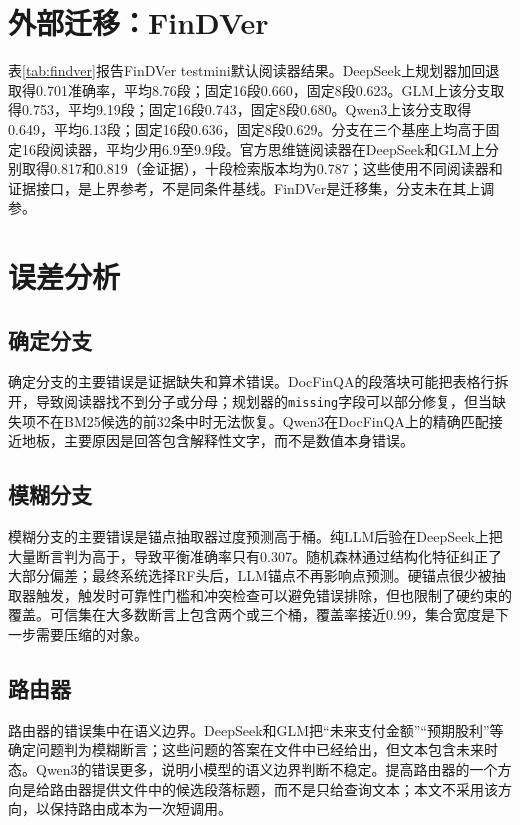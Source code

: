 \section{外部迁移：FinDVer}

表\ref{tab:findver}报告FinDVer testmini默认阅读器结果。DeepSeek上规划器加回退取得0.701准确率，平均8.76段；固定16段0.660，固定8段0.623。GLM上该分支取得0.753，平均9.19段；固定16段0.743，固定8段0.680。Qwen3上该分支取得0.649，平均6.13段；固定16段0.636，固定8段0.629。分支在三个基座上均高于固定16段阅读器，平均少用6.9至9.9段。官方思维链阅读器在DeepSeek和GLM上分别取得0.817和0.819（金证据），十段检索版本均为0.787；这些使用不同阅读器和证据接口，是上界参考，不是同条件基线。FinDVer是迁移集，分支未在其上调参。



\section{误差分析}

\subsection{确定分支}

确定分支的主要错误是证据缺失和算术错误。DocFinQA的段落块可能把表格行拆开，导致阅读器找不到分子或分母；规划器的\texttt{missing}字段可以部分修复，但当缺失项不在BM25候选的前32条中时无法恢复。Qwen3在DocFinQA上的精确匹配接近地板，主要原因是回答包含解释性文字，而不是数值本身错误。

\subsection{模糊分支}

模糊分支的主要错误是锚点抽取器过度预测高于桶。纯LLM后验在DeepSeek上把大量断言判为高于，导致平衡准确率只有0.307。随机森林通过结构化特征纠正了大部分偏差；最终系统选择RF头后，LLM锚点不再影响点预测。硬锚点很少被抽取器触发，触发时可靠性门槛和冲突检查可以避免错误排除，但也限制了硬约束的覆盖。可信集在大多数断言上包含两个或三个桶，覆盖率接近0.99，集合宽度是下一步需要压缩的对象。

\subsection{路由器}

路由器的错误集中在语义边界。DeepSeek和GLM把“未来支付金额”“预期股利”等确定问题判为模糊断言；这些问题的答案在文件中已经给出，但文本包含未来时态。Qwen3的错误更多，说明小模型的语义边界判断不稳定。提高路由器的一个方向是给路由器提供文件中的候选段落标题，而不是只给查询文本；本文不采用该方向，以保持路由成本为一次短调用。
